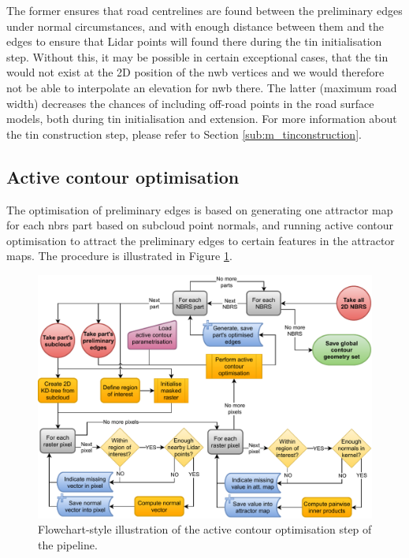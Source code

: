 The former ensures that road centrelines are found between the preliminary edges under normal circumstances, and with enough distance between them and the edges to ensure that Lidar points will found there during the \ac{tin} initialisation step. Without this, it may be possible in certain exceptional cases, that the \ac{tin} would not exist at the 2D position of the \ac{nwb} vertices and we would therefore not be able to interpolate an elevation for \ac{nwb} there. The latter (maximum road width) decreases the chances of including off-road points in the road surface models, both during \ac{tin} initialisation and extension. For more information about the \ac{tin} construction step, please refer to Section \ref{sub:m_tinconstruction}.

\subsection{Active contour optimisation}
\label{sub:m_activecontours}

The optimisation of preliminary edges is based on generating one attractor map for each \ac{nbrs} part based on subcloud point normals, and running active contour optimisation to attract the preliminary edges to certain features in the attractor maps. The procedure is illustrated in Figure \ref{fig:edgeoptimisationflow}.

\begin{figure}
    \centering
    \includegraphics[width=\linewidth]{final_report/figs/edge_optimisation.pdf}
    \caption{Flowchart-style illustration of the active contour optimisation step of the pipeline.}
    \label{fig:edgeoptimisationflow}
\end{figure}

